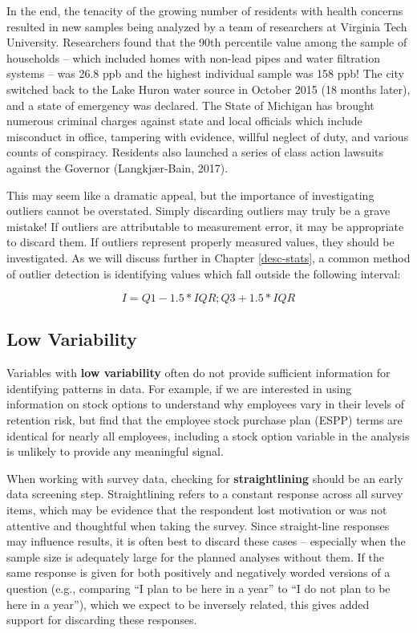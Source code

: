 \documentclass[
]{book}
\begin{document}
In the end, the tenacity of the growing number of residents with health concerns resulted in new samples being analyzed by a team of researchers at Virginia Tech University. Researchers found that the 90th percentile value among the sample of households -- which included homes with non-lead pipes and water filtration systems -- was 26.8 ppb and the highest individual sample was 158 ppb! The city switched back to the Lake Huron water source in October 2015 (18 months later), and a state of emergency was declared. The State of Michigan has brought numerous criminal charges against state and local officials which include misconduct in office, tampering with evidence, willful neglect of duty, and various counts of conspiracy. Residents also launched a series of class action lawsuits against the Governor (Langkjær-Bain, 2017).

This may seem like a dramatic appeal, but the importance of investigating outliers cannot be overstated. Simply discarding outliers may truly be a grave mistake! If outliers are attributable to measurement error, it may be appropriate to discard them. If outliers represent properly measured values, they should be investigated. As we will discuss further in Chapter \ref{desc-stats}, a common method of outlier detection is identifying values which fall outside the following interval:

\[I = Q1 - 1.5 * IQR; Q3 + 1.5 * IQR\]

\hypertarget{low-variability}{%
\subsection{Low Variability}\label{low-variability}}

Variables with \textbf{low variability} often do not provide sufficient information for identifying patterns in data. For example, if we are interested in using information on stock options to understand why employees vary in their levels of retention risk, but find that the employee stock purchase plan (ESPP) terms are identical for nearly all employees, including a stock option variable in the analysis is unlikely to provide any meaningful signal.

When working with survey data, checking for \textbf{straightlining} should be an early data screening step. Straightlining refers to a constant response across all survey items, which may be evidence that the respondent lost motivation or was not attentive and thoughtful when taking the survey. Since straight-line responses may influence results, it is often best to discard these cases -- especially when the sample size is adequately large for the planned analyses without them. If the same response is given for both positively and negatively worded versions of a question (e.g., comparing ``I plan to be here in a year'' to ``I do not plan to be here in a year''), which we expect to be inversely related, this gives added support for discarding these responses.
\end{document}
